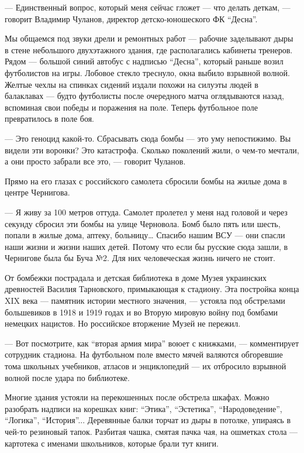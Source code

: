 
— Единственный вопрос, который меня сейчас гложет — что делать деткам, —
говорит Владимир Чуланов, директор детско-юношеского ФК \enquote{Десна}.

Мы общаемся под звуки дрели и ремонтных работ — рабочие заделывают дыры в стене
небольшого двухэтажного здания, где располагались кабинеты тренеров. Рядом —
большой синий автобус с надписью \enquote{Десна}, который раньше возил футболистов на
игры. Лобовое стекло треснуло, окна выбило взрывной волной. Желтые чехлы на
спинках сидений издали похожи на силуэты людей в балаклавах — будто футболисты
после очередного матча оглядываются назад, вспоминая свои победы и поражения на
поле. Теперь футбольное поле превратилось в поле боя. 

— Это геноцид какой-то. Сбрасывать сюда бомбы — это уму непостижимо. Вы видели
эти воронки? Это катастрофа. Сколько поколений жили, о чем-то мечтали, а они
просто забрали все это, — говорит Чуланов.

Прямо на его глазах с российского самолета сбросили бомбы на жилые дома в
центре Чернигова.

— Я живу за 100 метров оттуда. Самолет пролетел у меня над головой и через
секунду сбросил эти бомбы на улице Черновола. Бомб было пять или шесть, попали
в жилые дома, аптеку, больницу… Спасибо нашим ВСУ — они спасли наши жизни и
жизни наших детей. Потому что если бы русские сюда зашли, в Чернигове была бы
Буча №2. Для них человеческая жизнь ничего не стоит.

От бомбежки пострадала и детская библиотека в доме Музея украинских древностей
Василия Тарновского, примыкающая к стадиону. Эта постройка конца XIX века —
памятник истории местного значения, — устояла под обстрелами большевиков в 1918
и 1919 годах и во Вторую мировую войну под бомбами немецких нацистов. Но
российское вторжение Музей не пережил.


— Вот посмотрите, как \enquote{вторая армия мира} воюет с книжками, — комментирует
сотрудник стадиона. На футбольном поле вместо мячей валяются обгоревшие тома
школьных учебников, атласов и энциклопедий — их отбросило взрывной волной после
удара по библиотеке. 

Многие здания устояли на перекошенных после обстрела шкафах. Можно разобрать
надписи на корешках книг: \enquote{Этика}, \enquote{Эстетика}, \enquote{Народоведение}, \enquote{Логика},
\enquote{История}... Деревянные балки торчат из дыры в потолке, упираясь в чей-то
резиновый тапок. Разбитая чашка, смятая пачка чая, на ошметках стола —
картотека с именами школьников, которые брали тут книги.


